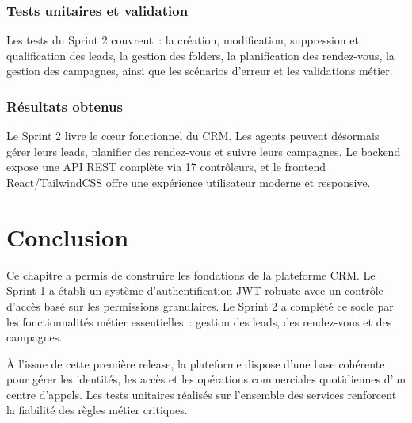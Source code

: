 \subsubsection{Tests unitaires et validation}

Les tests du Sprint 2 couvrent~: la création, modification, suppression et qualification des
leads, la gestion des folders, la planification des rendez-vous, la gestion des campagnes,
ainsi que les scénarios d'erreur et les validations métier.

\subsubsection{Résultats obtenus}

Le Sprint 2 livre le cœur fonctionnel du CRM. Les agents peuvent désormais gérer leurs leads,
planifier des rendez-vous et suivre leurs campagnes. Le backend expose une API REST complète
via 17 contrôleurs, et le frontend React/TailwindCSS offre une expérience utilisateur moderne
et responsive.

\section*{Conclusion}
\label{sec:chap4_conclusion}

Ce chapitre a permis de construire les fondations de la plateforme CRM. Le Sprint 1 a établi
un système d'authentification JWT robuste avec un contrôle d'accès basé sur les permissions
granulaires. Le Sprint 2 a complété ce socle par les fonctionnalités métier essentielles~:
gestion des leads, des rendez-vous et des campagnes.

À l'issue de cette première release, la plateforme dispose d'une base cohérente pour gérer
les identités, les accès et les opérations commerciales quotidiennes d'un centre d'appels.
Les tests unitaires réalisés sur l'ensemble des services renforcent la fiabilité des règles
métier critiques.
